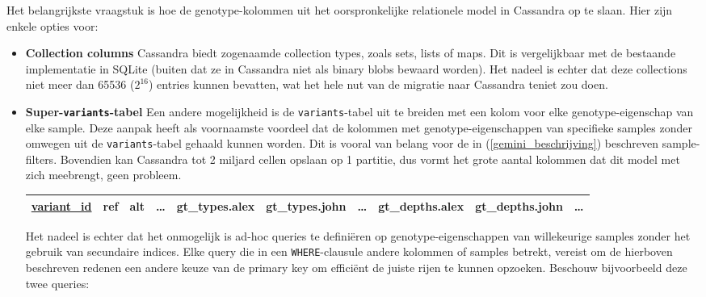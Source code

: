 Het belangrijkste vraagstuk is hoe de genotype-kolommen uit het oorspronkelijke relationele model in Cassandra op te slaan. Hier zijn enkele opties voor:

\begin{itemize}

\item \textbf{Collection columns} Cassandra biedt zogenaamde collection types, zoals sets, lists of maps. Dit is vergelijkbaar met de bestaande implementatie in SQLite (buiten dat ze in Cassandra niet als binary blobs bewaard worden). Het nadeel is echter dat deze collections niet meer dan 65536 ($2^{16}$) entries kunnen bevatten, wat het hele nut van de migratie naar Cassandra teniet zou doen.

\item \textbf{Super-\texttt{variants}-tabel} Een andere mogelijkheid is de \texttt{variants}-tabel uit te breiden met een kolom voor elke genotype-eigenschap van elke sample. Deze aanpak heeft als voornaamste voordeel dat de kolommen met genotype-eigenschappen van specifieke samples zonder omwegen uit de \texttt{variants}-tabel gehaald kunnen worden. Dit is vooral van belang voor de in (\ref{gemini_beschrijving}) beschreven sample-filters. Bovendien kan Cassandra tot 2 miljard cellen opslaan op 1 partitie, dus vormt het grote aantal kolommen dat dit model met zich meebrengt, geen probleem.\\

\begin{table}[!h]
\begin{adjustwidth}{-0.75in}{}
\begin{tabular}{@{}|l|l|l|l|l|l|l|l|l|l|@{}}
\toprule
\color{ForestGreen} \underline{variant\_id} & ref & alt & \ldots & gt\_types.alex & gt\_types.john & \ldots & gt\_depths.alex & gt\_depths.john & \ldots \\ \bottomrule
\end{tabular}
\end{adjustwidth}
\end{table}

Het nadeel is echter dat het onmogelijk is ad-hoc queries te defini\"eren op genotype-eigenschappen van willekeurige samples zonder het gebruik van secundaire indices. Elke query die in een \texttt{WHERE}-clausule andere kolommen of samples betrekt, vereist om de hierboven beschreven redenen een andere keuze van de primary key om effici\"ent de juiste rijen te kunnen opzoeken. Beschouw bijvoorbeeld deze twee queries:\\ 


\end{itemize}
